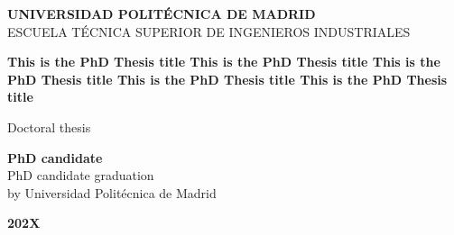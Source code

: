 \begin{center}
\begin{spacing}{1.3}
\textbf{\Large UNIVERSIDAD POLITÉCNICA DE MADRID}\\
{\large ESCUELA TÉCNICA SUPERIOR DE INGENIEROS INDUSTRIALES}\\
\end{spacing}
\end{center}

\vspace{40mm}

\begin{center}
\begin{spacing}{1.6}
\textbf{\LARGE This is the PhD Thesis title This is the PhD Thesis title This is the PhD Thesis title This is the PhD Thesis title This is the PhD Thesis title}
\end{spacing}
\end{center}

\vspace{10 mm}

\begin{center}
{\Large Doctoral thesis}
\end{center}

\vspace{15 mm}

\begin{center}
\begin{spacing}{1.7}
\textbf{\Large PhD candidate}\\
{\large PhD candidate graduation}\\
{\large by Universidad Politécnica de Madrid}\\
\end{spacing}
\end{center}

\vspace{25 mm}

\begin{center}
    \textbf{\Large 202X}
\end{center}